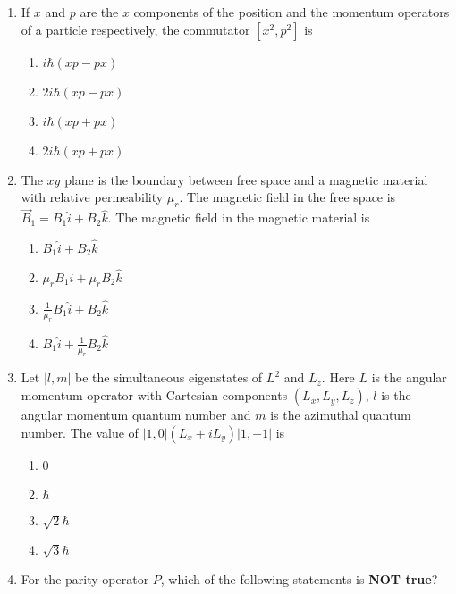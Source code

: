\documentclass{article}
\newcommand{\brak}[1]{\left( #1 \right)}
\newcommand{\sbrak}[1]{\left[ #1 \right]}
\newcommand{\abs}[1]{\left| #1 \right|}
\begin{document}
\begin{enumerate}
\begin{figure}[!ht]
\label{fig:my_label}
\end{figure}
   

    \item If $x$ and $p$ are the $x$ components of the position and the momentum operators of a particle respectively, the commutator $\sbrak{x^2, p^2}$  
 is

    \begin{enumerate}
        \item $i\hbar\brak{xp - px}$
        \item $2i\hbar\brak{xp - px}$
        \item $i\hbar\brak{xp + px}$
        \item $2i\hbar\brak{xp + px}$
    \end{enumerate}

    \item The $xy$ plane is the boundary between free space and a magnetic material with relative permeability $\mu_r$. The magnetic field in the free space  
 is $\vec{B}_1 = B_1 \hat{i} + B_2 \hat{k}$. The magnetic field in the magnetic material is

    \begin{enumerate}
        \item $B_1 \hat{i} + B_2 \hat{k}$
        \item $\mu_r B_1 \hat{i} + \mu_r B_2 \hat{k}$
        \item $\frac{1}{\mu_r} B_1 \hat{i} + B_2 \hat{k}$
        \item $B_1 \hat{i} + \frac{1}{\mu_r} B_2 \hat{k}$
    \end{enumerate}

    \item Let $\abs{l,m}$ be the simultaneous eigenstates of $L^2$ and $L_z$. Here $L$ is the angular momentum operator with Cartesian components $\brak{L_x, L_y, L_z}$, $l$ is the angular momentum quantum number and $m$ is the azimuthal quantum number. The value of $\abs{1,0}\brak{L_x + iL_y}\abs{1,-1}$ is

    \begin{enumerate}
        \item 0
        \item $\hbar$
        \item $\sqrt{2}\hbar$
        \item $\sqrt{3}\hbar$
    \end{enumerate}

\item For the parity operator $P$, which of the following statements is \textbf{NOT true}?


\end{enumerate}
\end{document}
